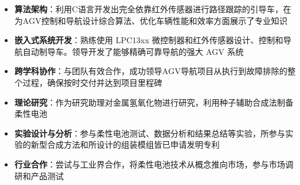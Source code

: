 \begin{itemize}
\small 
  \item \textbf{算法架构}：利用C语言开发出完全依靠红外传感器进行路径跟踪的引导车，在为AGV控制和导航设计综合算法、优化车辆性能和效率方面展示了专业知识
  \item \textbf{嵌入式系统开发}：熟练使用 LPC13xx 微控制器和红外传感器设计、控制和导航自动制导车。领导开发了能够精确可靠导航的强大 AGV 系统
  \item \textbf{跨学科协作}：与团队有效合作，成功领导AGV导航项目从执行到故障排除的整个过程，确保按时交付并达到项目里程碑
\end{itemize}

\begin{itemize}
\small 
  \item \textbf{理论研究}：作为研究助理对金属氢氧化物进行研究，利用种子辅助合成法制备柔性电池
  \item \textbf{实验设计与分析}：参与柔性电池测试、数据分析和结果总结等实验，所参与实验的新型合成方法和所设计的组装模组皆已申请发明专利
  \item \textbf{行业合作}：尝试与工业界合作，将柔性电池技术从概念推向市场，参与市场调研和产品测试
\end{itemize}


